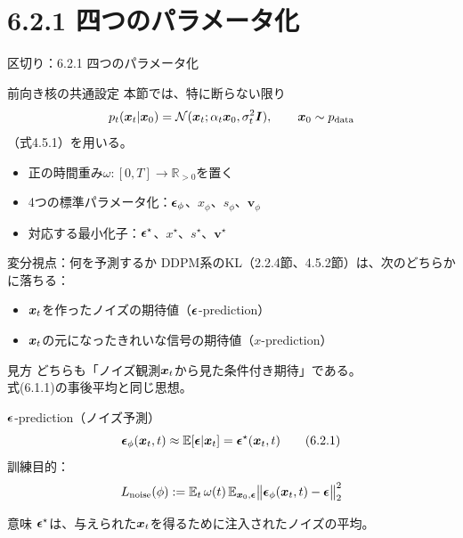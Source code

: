 \section{6.2.1 四つのパラメータ化}
\asmain
\begin{frame}{区切り：6.2.1 四つのパラメータ化}
    \tableofcontents[currentsection]
\end{frame}
\asmain
\begin{frame}{前向き核の共通設定}
    本節では、特に断らない限り
    \[
        p_t(\bm{x}_t|\bm{x}_0)
        =
        \mathcal{N}(\bm{x}_t;\alpha_t\bm{x}_0,\sigma_t^{2}\bm{I}),
        \qquad
        \bm{x}_0\sim p_{\mathrm{data}}
    \]
    （式4.5.1）を用いる。
    \begin{itemize}
        \item 正の時間重み$\omega:[0,T]\to\mathbb{R}_{>0}$を置く
        \item 4つの標準パラメータ化：$\bm{\epsilon}_\phi$、$x_\phi$、$s_\phi$、$\bm{v}_\phi$
        \item 対応する最小化子：$\bm{\epsilon}^\star$、$x^\star$、$s^\star$、$\bm{v}^\star$
    \end{itemize}
\end{frame}
\asmain
\begin{frame}{変分視点：何を予測するか}
    DDPM系のKL（2.2.4節、4.5.2節）は、次のどちらかに落ちる：
    \begin{itemize}
        \item $\bm{x}_t$を作ったノイズの期待値（$\bm{\epsilon}$-prediction）
        \item $\bm{x}_t$の元になったきれいな信号の期待値（$x$-prediction）
    \end{itemize}
    \begin{block}{見方}
        どちらも「ノイズ観測$\bm{x}_t$から見た条件付き期待」である。\\
        式(6.1.1)の事後平均と同じ思想。
    \end{block}
\end{frame}
\asmain
\begin{frame}{$\bm{\epsilon}$-prediction（ノイズ予測）}
    \[
        \bm{\epsilon}_\phi(\bm{x}_t,t)
        \approx
        \mathbb{E}[\bm{\epsilon}|\bm{x}_t]
        =
        \bm{\epsilon}^\star(\bm{x}_t,t)
        \tag{6.2.1}
    \]
    訓練目的：
    \[
        L_{\mathrm{noise}}(\phi)
        :=
        \mathbb{E}_{t}\,
        \omega(t)\,
        \mathbb{E}_{\bm{x}_0,\bm{\epsilon}}
        \bigl\|
        \bm{\epsilon}_\phi(\bm{x}_t,t)-\bm{\epsilon}
        \bigr\|_{2}^{2}
    \]
    \begin{exampleblock}{意味}
        $\bm{\epsilon}^\star$は、与えられた$\bm{x}_t$を得るために注入されたノイズの平均。
    \end{exampleblock}
\end{frame}
